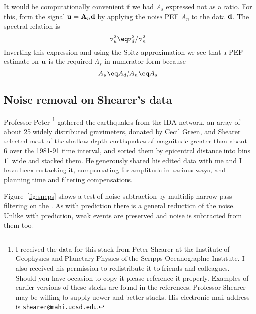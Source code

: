 \par
It would be computationally convenient if
we had $A_s$ expressed not as a ratio.
For this, form the signal
$\bold u = \bold A_n \bold d$
by applying the noise PEF $A_n$ to the data $\bold d$.
The spectral relation is
\begin{equation}
\sigma_u^2 \eq 
\sigma_d^2 /
\sigma_n^2
\end{equation}
Inverting this expression
and using the Spitz approximation
we see that
a PEF estimate on $\bold u$ is the required $A_s$ in numerator form because
\begin{equation}
A_u \eq A_d / A_n \eq A_s
\end{equation}

\subsection{Noise removal on Shearer's data}
Professor Peter \footnote{
        I received the data for this stack from Peter Shearer
        at the  Institute of Geophysics
        and Planetary Physics of the Scripps Oceanographic Institute.
        I also received his permission to redistribute it
        to friends and colleagues.
        Should you have occasion to copy it please reference
        \cite{Shearer.jgr.91.18147} \cite{Shearer.jgr.91.20535}
        it properly.
        Examples of earlier versions of these stacks
        are found in the references.
        Professor Shearer may be willing to supply newer and better stacks.
        His electronic mail address is {\tt shearer@mahi.ucsd.edu}.
        }
gathered the earthquakes from the IDA network,
an array of about 25 widely distributed gravimeters,
donated by Cecil Green,
and Shearer selected most of the shallow-depth earthquakes
of magnitude greater than about 6 over the 1981-91 time interval,
and sorted them by epicentral distance into bins $1^\circ$ wide
and stacked them.
He generously shared his edited data with me
and I have been restacking it,
compensating for amplitude in various ways,
and planning time and filtering compensations.

\par
Figure~\ref{fig:sneps} shows a test of noise subtraction
by multidip narrow-pass filtering
on the .
As with prediction there is a general reduction of the noise.
Unlike with prediction, weak events are preserved
and noise is subtracted from them too.

